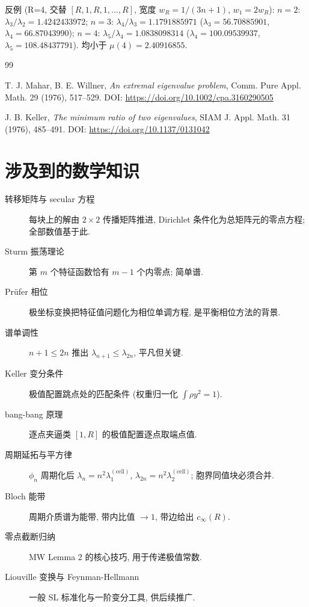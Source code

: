 \documentclass[UTF8]{ctexart}
\begin{document}
反例 (R=4, 交替 $[R,1,R,1,\dots,R]$, 宽度 $w_R = 1/(3n+1)$, $w_1 = 2w_R$):
$n=2$: $\lambda_3/\lambda_2 = 1.4242433972$; $n=3$: $\lambda_4/\lambda_3 = 1.1791885971$
($\lambda_3 = 56.70885901$, $\lambda_4 = 66.87043990$);
$n=4$: $\lambda_5/\lambda_4 = 1.0838098314$
($\lambda_4 = 100.09539937$, $\lambda_5 = 108.48437791$). 均小于 $\mu(4) = 2.40916855$.

\begin{thebibliography}{99}

 T. J. Mahar, B. E. Willner, \emph{An extremal eigenvalue problem},
	Comm. Pure Appl. Math. 29 (1976), 517--529.
	DOI: \url{https://doi.org/10.1002/cpa.3160290505}

 J. B. Keller, \emph{The minimum ratio of two eigenvalues},
	SIAM J. Appl. Math. 31 (1976), 485--491.
	DOI: \url{https://doi.org/10.1137/0131042}

\end{thebibliography}

\section{涉及到的数学知识}

\begin{description}
	\item[转移矩阵与 secular 方程] 每块上的解由 $2\times 2$ 传播矩阵推进,
		Dirichlet 条件化为总矩阵元的零点方程; 全部数值基于此.
	\item[Sturm 振荡理论] 第 $m$ 个特征函数恰有 $m-1$ 个内零点; 简单谱.
	\item[Pr\"ufer 相位] 极坐标变换把特征值问题化为相位单调方程, 是平衡相位方法的背景.
	\item[谱单调性] $n+1 \leq 2n$ 推出 $\lambda_{n+1} \leq \lambda_{2n}$, 平凡但关键.
	\item[Keller 变分条件] 极值配置跳点处的匹配条件 (权重归一化 $\int \rho y^2 = 1$).
	\item[bang-bang 原理] 逐点夹逼类 $[1,R]$ 的极值配置逐点取端点值.
	\item[周期延拓与平方律] $\phi_n$ 周期化后 $\lambda_n = n^2\lambda_1^{(\text{cell})}$,
		$\lambda_{2n} = n^2\lambda_2^{(\text{cell})}$; 胞界同值块必须合并.
	\item[Bloch 能带] 周期介质谱为能带, 带内比值 $\to 1$, 带边给出 $c_{\infty}(R)$.
	\item[零点截断归纳] MW Lemma 2 的核心技巧, 用于传递极值常数.
	\item[Liouville 变换与 Feynman-Hellmann] 一般 SL 标准化与一阶变分工具, 供后续推广.
\end{description}
\end{document}
